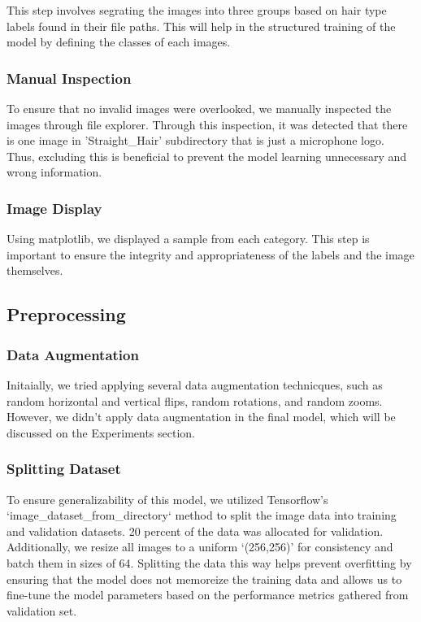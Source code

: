 This step involves segrating the images into three groups based on hair type labels found in their file paths. This will help in the structured training of the model by defining the classes of each images.

\subsubsection{Manual Inspection}

To ensure that no invalid images were overlooked, we manually inspected the images through file explorer. Through this inspection, it was detected that there is one image in 'Straight_Hair' subdirectory that is just a microphone logo. Thus, excluding this is beneficial to prevent the model learning unnecessary and wrong information.

\subsubsection{Image Display}

Using matplotlib, we displayed a sample from each category. This step is important to ensure the integrity and appropriateness of the labels and the image themselves.

\subsection{Preprocessing}

\subsubsection{Data Augmentation}

Initaially, we tried applying several data augmentation technicques, such as random horizontal and vertical flips, random rotations, and random zooms. However, we didn't apply data augmentation in the final model, which will be discussed on the Experiments section.

\subsubsection{Splitting Dataset}

To ensure generalizability of this model, we utilized Tensorflow's `image_dataset_from_directory` method to split the image data into training and validation datasets. 20 percent of the data was allocated for validation. Additionally, we resize all images to a uniform `(256,256)' for consistency and batch them in sizes of 64. Splitting the data this way helps prevent overfitting by ensuring that the model does not memoreize the training data and allows us to fine-tune the model parameters based on the performance metrics gathered from validation set.

